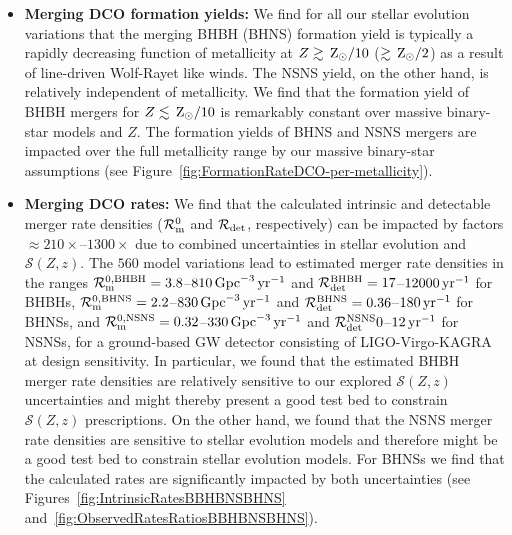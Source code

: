 \documentclass[fleqn,usenatbib]{mnras}
\newcommand\rate{\mathcal{R}}
\newcommand{\Zi}{\ensuremath{Z}\xspace}
\newcommand{\Zsun}{\ensuremath{\,\rm{Z}_{\odot}}\xspace}
\newcommand{\yearmin}{\ensuremath{\,\rm{yr}^{-1}}\xspace}
\newcommand{\GpcminThree}{\ensuremath{\,\rm{Gpc}^{-3}}\xspace}
\newcommand{\SFRD}{\ensuremath{\mathcal{S}(Z,z)}\xspace}
\newcommand{\Nmodels}{\ensuremath{560}\xspace}
\newcommand{\RateIntrinsicZero}{\ensuremath{\mathcal{R}_{\rm{m}}^{0}}\xspace}
\newcommand{\RateObserved}{\ensuremath{\mathcal{R}_{\rm{det}}}\xspace}
\newcommand{\RateIntrinsicAzeroBHBHmin}{\ensuremath{3.8}\xspace}
\newcommand{\RateIntrinsicAzeroBHBHmax}{\ensuremath{810}\xspace}
\newcommand{\RateIntrinsicAzeroBHNSmin}{\ensuremath{2.2}\xspace}  %
\newcommand{\RateIntrinsicAzeroBHNSmax}{\ensuremath{830}\xspace} %
\newcommand{\RateIntrinsicAzeroNSNSmin}{\ensuremath{0.32}\xspace}
\newcommand{\RateIntrinsicAzeroNSNSmax}{\ensuremath{330}\xspace}
\newcommand{\RateObservedAzeroBHBHmax}{\ensuremath{12000}\xspace}
\newcommand{\RateObservedAzeroBHBHmin}{\ensuremath{17}\xspace}
\newcommand{\RateObservedAzeroBHNSmax}{\ensuremath{180}\xspace}
\newcommand{\RateObservedAzeroBHNSmin}{\ensuremath{0.36}\xspace}
\newcommand{\RateObservedAzeroNSNSmax}{\ensuremath{12}\xspace}
\newcommand{\RateObservedAzeroNSNSmin}{\ensuremath{0}\xspace}
\begin{document}
\begin{itemize}
    \item \textbf{Merging \ac{DCO} formation yields:} We find for all our stellar evolution variations that the merging BHBH (BHNS) formation yield is typically a rapidly decreasing function of metallicity at   $\Zi \gtrsim \Zsun / 10$ ($\gtrsim \Zsun /2$) as a result of line-driven  Wolf-Rayet like winds. 
    The NSNS yield, on the other hand, is relatively independent of metallicity. 
    We find that the formation yield of BHBH mergers for $\Zi \lesssim \Zsun/10$ is remarkably constant over massive binary-star models and \Zi. 
    The formation yields of BHNS and NSNS mergers are impacted over the full metallicity range by our massive binary-star assumptions  (see Figure~\ref{fig:FormationRateDCO-per-metallicity}).\\ 

    
    \item \textbf{Merging \ac{DCO} rates:} We find that the  calculated intrinsic and detectable merger rate densities (\RateIntrinsicZero and \RateObserved, respectively) can be impacted by factors $\approx 210\times$--$1300\times$ due to combined uncertainties in stellar evolution and \SFRD. The \Nmodels model variations lead to estimated merger rate densities in the ranges  
    $\rate^{0,\rm{BHBH}}_{\rm{m}} = \RateIntrinsicAzeroBHBHmin$--$ \RateIntrinsicAzeroBHBHmax \GpcminThree\yearmin$ and
    $\rate^{\rm{BHBH}}_{\rm{det}} = \RateObservedAzeroBHBHmin$--$ \RateObservedAzeroBHBHmax \yearmin$ for \acp{BHBH},      $\rate^{0,\rm{BHNS}}_{\rm{m}} = \RateIntrinsicAzeroBHNSmin$--$\RateIntrinsicAzeroBHNSmax\GpcminThree\yearmin$ and   $\rate^{\rm{BHNS}}_{\rm{det}} = \RateObservedAzeroBHNSmin$--$ \RateObservedAzeroBHNSmax \yearmin$ for \acp{BHNS}, and   $\rate^{0,\rm{NSNS}}_{\rm{m}} = \RateIntrinsicAzeroNSNSmin$--$\RateIntrinsicAzeroNSNSmax \GpcminThree\yearmin$ and   $\rate^{\rm{NSNS}}_{\rm{det}}  \RateObservedAzeroNSNSmin$--$\RateObservedAzeroNSNSmax \yearmin$ for \acp{NSNS}, for a ground-based GW detector consisting of LIGO-Virgo-KAGRA at design sensitivity.
    In particular, we found that the estimated \ac{BHBH} merger rate densities are relatively sensitive to our explored \SFRD uncertainties and might thereby present a good test bed to constrain \SFRD prescriptions.  On the other hand, we found that the \ac{NSNS} merger rate densities are sensitive to stellar evolution models and therefore might be a good test bed to constrain stellar evolution models. 
    For \acp{BHNS} we find that the calculated rates are significantly impacted by both uncertainties  (see Figures~\ref{fig:IntrinsicRatesBBHBNSBHNS} and~\ref{fig:ObservedRatesRatiosBBHBNSBHNS}).\\ 
    

\end{itemize}
\end{document}
